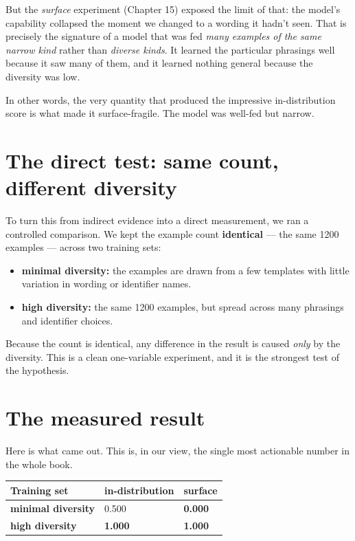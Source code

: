 But the \emph{surface} experiment (Chapter 15) exposed the limit of
that: the model's capability collapsed the moment we changed to a
wording it hadn't seen. That is precisely the signature of a model that
was fed \emph{many examples of the same narrow kind} rather than
\emph{diverse kinds}. It learned the particular phrasings well because
it saw many of them, and it learned nothing general because the
diversity was low.

In other words, the very quantity that produced the impressive
in-distribution score is what made it surface-fragile. The model was
well-fed but narrow.

\section{The direct test: same count, different
diversity}\label{the-direct-test-same-count-different-diversity}

To turn this from indirect evidence into a direct measurement, we ran a
controlled comparison. We kept the example count \textbf{identical} ---
the same 1200 examples --- across two training sets:

\begin{itemize}
\tightlist
\item
  \textbf{minimal diversity:} the examples are drawn from a few
  templates with little variation in wording or identifier names.
\item
  \textbf{high diversity:} the same 1200 examples, but spread across
  many phrasings and identifier choices.
\end{itemize}

Because the count is identical, any difference in the result is caused
\emph{only} by the diversity. This is a clean one-variable experiment,
and it is the strongest test of the hypothesis.

\section{The measured result}\label{the-measured-result}

Here is what came out. This is, in our view, the single most actionable
number in the whole book.

\begin{longtable}[]{@{}lll@{}}
\toprule\noalign{}
Training set & in-distribution & surface \\
\midrule\noalign{}
\endhead
\bottomrule\noalign{}
\endlastfoot
\textbf{minimal diversity} & 0.500 & \textbf{0.000} \\
\textbf{high diversity} & \textbf{1.000} & \textbf{1.000} \\
\end{longtable}

